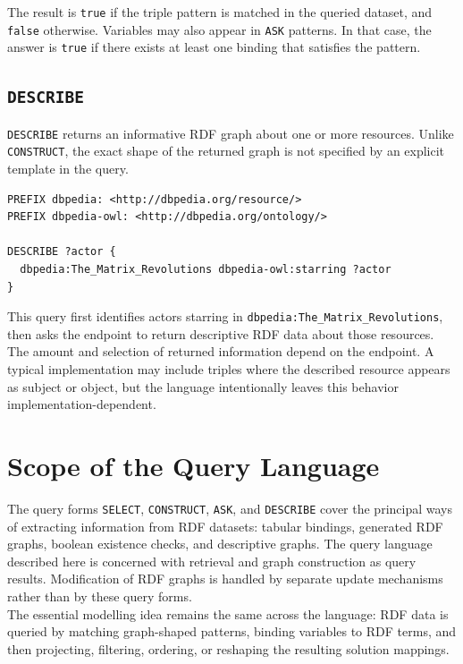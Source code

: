 \documentclass{scrbook}
\begin{document}
	The result is \texttt{true} if the triple pattern is matched in the queried dataset, and \texttt{false} otherwise. Variables may also appear in \texttt{ASK} patterns. In that case, the answer is \texttt{true} if there exists at least one binding that satisfies the pattern.
	
	\subsection{\texttt{DESCRIBE}}
	
	\texttt{DESCRIBE} returns an informative RDF graph about one or more resources. Unlike \texttt{CONSTRUCT}, the exact shape of the returned graph is not specified by an explicit template in the query.
	
	\begin{lstlisting}
PREFIX dbpedia: <http://dbpedia.org/resource/>
PREFIX dbpedia-owl: <http://dbpedia.org/ontology/>

DESCRIBE ?actor {
  dbpedia:The_Matrix_Revolutions dbpedia-owl:starring ?actor
}
	\end{lstlisting}
	
	This query first identifies actors starring in \texttt{dbpedia:The\_Matrix\_Revolutions}, then asks the endpoint to return descriptive RDF data about those resources. The amount and selection of returned information depend on the endpoint. A typical implementation may include triples where the described resource appears as subject or object, but the language intentionally leaves this behavior implementation-dependent.
	
	\section{Scope of the Query Language}
	
	The query forms \texttt{SELECT}, \texttt{CONSTRUCT}, \texttt{ASK}, and \texttt{DESCRIBE} cover the principal ways of extracting information from RDF datasets: tabular bindings, generated RDF graphs, boolean existence checks, and descriptive graphs. The query language described here is concerned with retrieval and graph construction as query results. Modification of RDF graphs is handled by separate update mechanisms rather than by these query forms.\\
	
	The essential modelling idea remains the same across the language: RDF data is queried by matching graph-shaped patterns, binding variables to RDF terms, and then projecting, filtering, ordering, or reshaping the resulting solution mappings.
\end{document}
